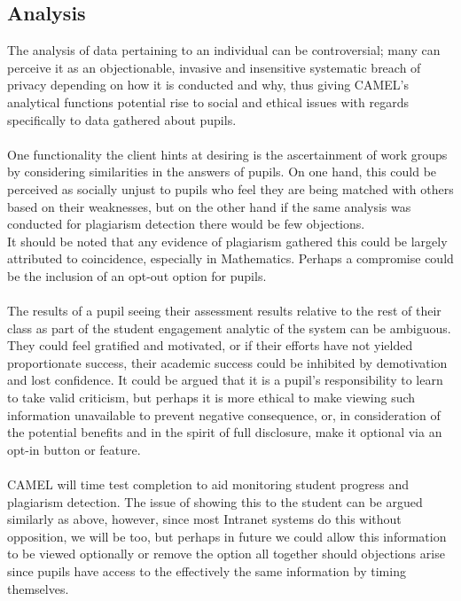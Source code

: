 \subsection*{Analysis}
The analysis of data pertaining to an individual can be controversial; many can perceive it as an objectionable, invasive and insensitive systematic breach of privacy depending on how it is conducted and why, thus giving CAMEL’s analytical functions potential rise to social and ethical issues with regards specifically to data gathered about pupils.
\\\\One functionality the client hints at desiring is the ascertainment of work groups by considering similarities in the answers of pupils. On one hand, this could be perceived as socially unjust to pupils who feel they are being matched with others based on their weaknesses, but on the other hand if the same analysis was conducted for plagiarism detection there would be few objections.
\\It should be noted that any evidence of plagiarism gathered this could be largely attributed to coincidence, especially in Mathematics. Perhaps a compromise could be the inclusion of an opt-out option for pupils.
\\\\The results of a pupil seeing their assessment results relative to the rest of their class as part of the student engagement analytic of the system can be ambiguous. They could feel gratified and motivated, or if their efforts have not yielded proportionate success, their academic success could be inhibited by demotivation and lost confidence. It could be argued that it is a pupil's responsibility to learn to take valid criticism, but perhaps it is more ethical to make viewing such information unavailable to prevent negative consequence, or, in consideration of the potential benefits and in the spirit of full disclosure, make it optional via an opt-in button or feature.
\\\\CAMEL will time test completion to aid monitoring student progress and plagiarism detection. The issue of showing this to the student can be argued similarly as above, however, since most Intranet systems do this without opposition, we will be too, but perhaps in future we could allow this information to be viewed optionally or remove the option all together should objections arise since pupils have access to the effectively the same information by timing themselves.
